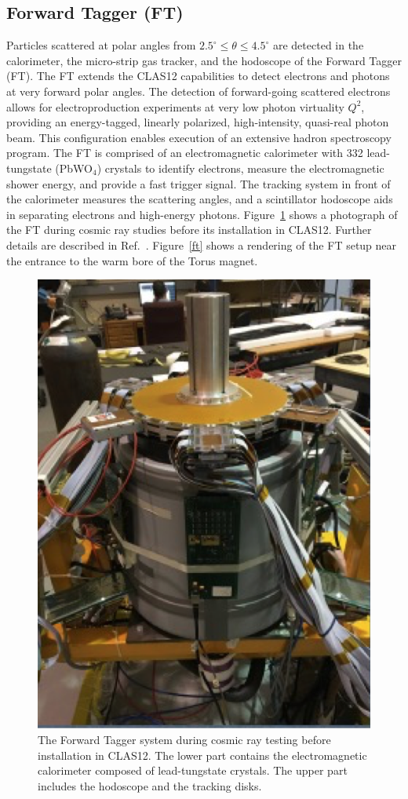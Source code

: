 \documentclass[final,3p,twocolumn]{elsarticle}
\begin{document}
\subsection{Forward Tagger (FT)}

Particles scattered at polar angles from $2.5^\circ \le \theta \le 4.5^\circ $ are detected in the calorimeter, the
micro-strip gas tracker, and the hodoscope of the Forward Tagger (FT). The FT extends the CLAS12 capabilities to
detect electrons and photons at very forward polar angles. The detection of forward-going scattered electrons allows
for electroproduction experiments at very low photon virtuality $Q^2$, providing an energy-tagged, linearly polarized,
high-intensity, quasi-real photon beam. This configuration enables execution of an extensive hadron spectroscopy
program. The FT is comprised of an electromagnetic calorimeter with 332 lead-tungstate (PbWO$_4$) crystals to
identify electrons,  measure the electromagnetic shower energy, and provide a fast trigger signal. The tracking system
in front of the calorimeter  measures the scattering angles, and a scintillator hodoscope aids in separating electrons and
high-energy photons. Figure~\ref{ft-photo} shows a photograph of the FT during cosmic ray studies before its installation
in CLAS12. Further details are described in Ref.~\cite{FT}. Figure~\ref{ft} shows a rendering of the FT setup near the
entrance to the warm bore of the Torus magnet.   

\begin{figure}[htbp!]
\centerline{\includegraphics[width=0.85\columnwidth]{FT-photo.png}}
\caption{The Forward Tagger system during cosmic ray testing before installation in CLAS12. The lower part contains
the electromagnetic calorimeter composed of lead-tungstate crystals. The upper part includes the hodoscope and the
tracking disks.}
\label{ft-photo}
\end{figure}
\end{document}
